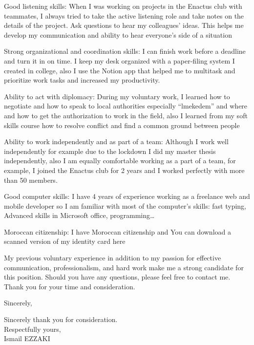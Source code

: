 \documentclass[11pt, a4paper]{awesome-cv}
\begin{document}
\begin{cvletter}
Good listening skills: When I was working on projects in the Enactus club with teammates, I always tried to take the active listening role and take notes on the details of the project. Ask questions to hear my colleagues' ideas. This helps me develop my communication and ability to hear everyone's side of a situation

Strong organizational and coordination skills: I can finish work before a deadline and turn it in on time. I keep my desk organized with a paper-filing system I created in college, also I use the Notion app that helped me to multitask and prioritize work tasks and increased my productivity.

Ability to act with diplomacy: During my voluntary work, I learned how to negotiate and how to speak to local authorities especially “lmekedem” and where and how to get the authorization to work in the field, also I learned from my soft skills course how to resolve conflict and find a common ground between people 

Ability to work independently and as part of a team: Although I work well independently for example due to the lockdown I did my master thesis independently, also I am equally comfortable working as a part of a team, for example, I joined the  Enactus club for 2 years and I worked perfectly with more than 50 members.

Good computer skills: I have 4 years of experience working as a freelance web and mobile developer so I am familiar with most of the computer’s skills: fast typing, Advanced skills in Microsoft office, programming… 

Moroccan citizenship: I have Moroccan citizenship and You can download a scanned version of my identity card here

My previous voluntary experience in addition to my passion for effective communication, professionalism, and hard work make me a strong candidate for this position. Should you have any questions, please feel free to contact me. Thank you for your time and consideration.

Sincerely,

\vspace{2ex}
Sincerely thank you for consideration.\\
Respectfully yours,\\
Ismail EZZAKI
	\end{cvletter}
	
	

	
\end{document}

